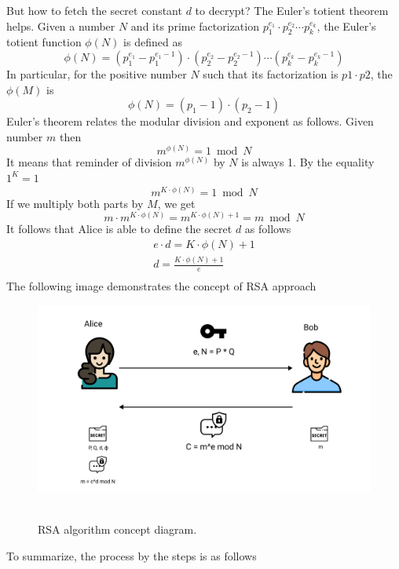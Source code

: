\documentclass[12pt,letterpaper,oneside,reqno]{amsart}
\begin{document}
    But how to fetch the secret constant $d$ to decrypt?
    The Euler's totient theorem helps.
    Given a number $N$ and its prime factorization $p_1^{e_1}\cdot p_2^{e_2} \cdots p_k^{e_k}$, the Euler's totient function
    $\phi(N)$ is defined as
    \[
        \phi(N) = (p_1^{e_1} - p_1^{e_1 - 1}) \cdot (p_2^{e_2} - p_2^{e_2 - 1}) \cdots (p_k^{e_k} - p_k^{e_k - 1})
    \]
    In particular, for the positive number $N$ such that its factorization is $p1 \cdot p2$, the $\phi(M)$ is
    \[
        \phi(N) = (p_1 -1) \cdot (p_2 - 1)
    \]
    Euler's theorem relates the modular division and exponent as follows.
    Given number $m$ then
    \[
        m^{\phi(N)} = 1 \bmod N
    \]
    It means that reminder of division $m^{\phi(N)}$ by $N$ is always 1.
    By the equality $1^K = 1$
    \[
        m^{K \cdot \phi(N)} = 1 \bmod N
    \]
    If we multiply both parts by $M$, we get
    \[
        m \cdot m^{K \cdot \phi(N)} = m^{K \cdot \phi(N) + 1} = m \bmod N
    \]
    It follows that Alice is able to define the secret $d$ as follows
    \begin{gather*}
        e \cdot d = K \cdot \phi(N) + 1\\
        d = \frac{K \cdot \phi(N) + 1}{e}\\
    \end{gather*}
    The following image demonstrates the concept of RSA approach
    \begin{figure}[H]
        \centering
        \includegraphics[width=1\textwidth]{12_RSA_encryption_concept_diagram}
        ~\caption{RSA algorithm concept diagram.}\label{fig:figure8}
    \end{figure}
    To summarize, the process by the steps is as follows
\end{document}
